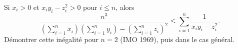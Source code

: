 Si $x_i > 0$ et $x_iy_i - z_i^2 > 0$ pour $i \leq n$, alors
\[ \frac{n^3}{\left(\sum_{i=1}^n x_i\right)\left(\sum_{i=1}^n y_i\right) - \left(\sum_{i=1}^n z_i\right)^2} \leq \sum_{i=1}^n \frac{1}{x_iy_i - z_i^2}. \]
Démontrer cette inégalité pour $n = 2$ (IMO 1969), puis dans le cas général.
